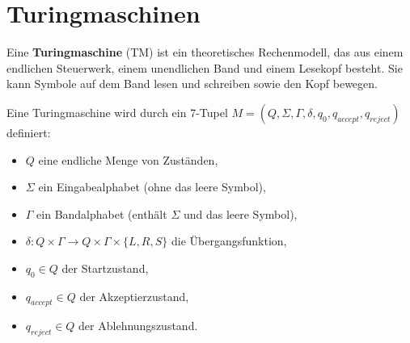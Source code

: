 \documentclass{article}
\begin{document}
\begin{minipage}[t]{0.45\textwidth}
\end{minipage}
\section*{Turingmaschinen}
\begin{minipage}[t]{0.45\textwidth}
    Eine \textbf{Turingmaschine} (TM) ist ein theoretisches Rechenmodell, das aus einem endlichen Steuerwerk, einem unendlichen Band und einem Lesekopf besteht. Sie kann Symbole auf dem Band lesen und schreiben sowie den Kopf bewegen.
    
    Eine Turingmaschine wird durch ein 7-Tupel $M = (Q, \Sigma, \Gamma, \delta, q_0, q_{accept}, q_{reject})$ definiert:
    \begin{itemize}
        \item $Q$ eine endliche Menge von Zuständen,
        \item $\Sigma$ ein Eingabealphabet (ohne das leere Symbol),
        \item $\Gamma$ ein Bandalphabet (enthält $\Sigma$ und das leere Symbol),
        \item $\delta: Q \times \Gamma \to Q \times \Gamma \times \{L, R, S\}$ die Übergangsfunktion,
        \item $q_0 \in Q$ der Startzustand,
        \item $q_{accept} \in Q$ der Akzeptierzustand,
        \item $q_{reject} \in Q$ der Ablehnungszustand.
    \end{itemize}
\end{minipage}
\hfill
\end{document}
